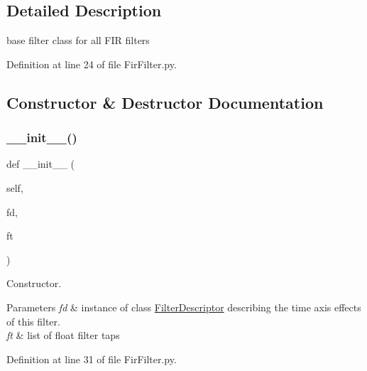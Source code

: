 \subsection{Detailed Description}
base filter class for all F\+IR filters 

Definition at line 24 of file Fir\+Filter.\+py.



\subsection{Constructor \& Destructor Documentation}
\mbox{\label{classSignalIntegrity_1_1TimeDomain_1_1Filters_1_1FirFilter_1_1FirFilter_aa769a401c278ca11fba676e33af50456}} 
\subsubsection{\texorpdfstring{\+\_\+\+\_\+init\+\_\+\+\_\+()}{\_\_init\_\_()}}
{\footnotesize\ttfamily def \+\_\+\+\_\+init\+\_\+\+\_\+ (\begin{DoxyParamCaption}\item[{}]{self,  }\item[{}]{fd,  }\item[{}]{ft }\end{DoxyParamCaption})}



Constructor. 


\begin{DoxyParams}{Parameters}
{\em fd} & instance of class \hyperlink{namespaceSignalIntegrity_1_1TimeDomain_1_1Filters_1_1FilterDescriptor}{Filter\+Descriptor} describing the time axis effects of this filter. \\
\hline
{\em ft} & list of float filter taps \\
\hline
\end{DoxyParams}


Definition at line 31 of file Fir\+Filter.\+py.



